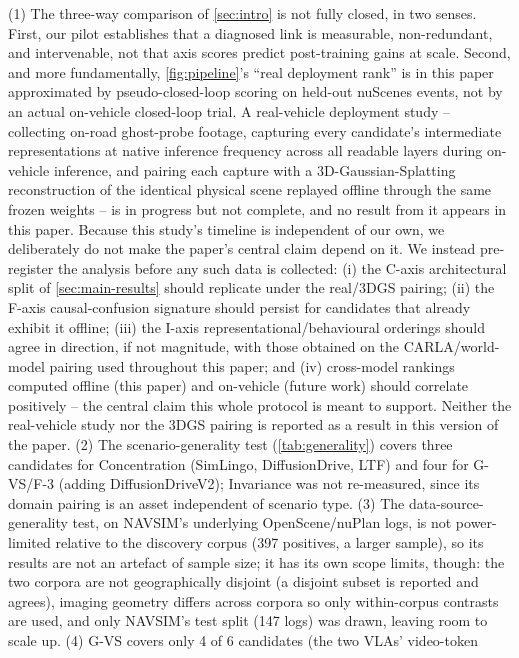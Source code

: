 (1) The three-way comparison of \cref{sec:intro} is not fully closed, in two senses.
First, our pilot establishes that a diagnosed link is measurable, non-redundant, and
intervenable, not that axis scores predict post-training gains at scale. Second, and more
fundamentally, \cref{fig:pipeline}'s ``real deployment rank'' is in this paper approximated
by pseudo-closed-loop scoring on held-out nuScenes events, not by an actual on-vehicle
closed-loop trial. A real-vehicle deployment study -- collecting on-road ghost-probe
footage, capturing every candidate's intermediate representations at native inference
frequency across all readable layers during on-vehicle inference, and pairing each
capture with a 3D-Gaussian-Splatting reconstruction of the identical physical scene
replayed offline through the same frozen weights -- is in progress but not complete, and
no result from it appears in this paper. Because this study's timeline is independent of
our own, we deliberately do not make the paper's central claim depend on it. We instead
pre-register the analysis before any such data is collected: (i) the C-axis architectural
split of \cref{sec:main-results} should replicate under the real/3DGS pairing; (ii) the
F-axis causal-confusion signature should persist for candidates that already exhibit it
offline; (iii) the I-axis representational/behavioural orderings should agree in
direction, if not magnitude, with those obtained on the CARLA/world-model pairing used
throughout this paper; and (iv) cross-model rankings computed offline (this paper) and
on-vehicle (future work) should correlate positively -- the central claim this whole
protocol is meant to support. Neither the real-vehicle study nor the 3DGS pairing is
reported as a result in this version of the paper.
(2) The scenario-generality test (\cref{tab:generality}) covers three candidates for
Concentration (SimLingo, DiffusionDrive, LTF) and four for G-VS/F-3 (adding
DiffusionDriveV2); Invariance was not re-measured, since its domain pairing is an asset
independent of scenario type. (3) The data-source-generality test, on NAVSIM's underlying
OpenScene/nuPlan logs, is not power-limited relative to the discovery corpus (397
positives, a larger sample), so its results are not an artefact of sample size; it has
its own scope limits, though: the two corpora are not geographically disjoint (a disjoint
subset is reported and agrees), imaging geometry differs across corpora so only
within-corpus contrasts are used, and only NAVSIM's test split (147 logs) was drawn,
leaving room to scale up. (4) G-VS covers only 4 of 6 candidates (the two VLAs' video-token

